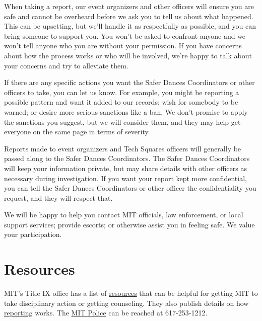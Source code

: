 \documentclass{article}
\begin{document}
When taking a report, our event organizers and other officers will ensure you are safe and cannot be overheard before we ask you to tell us about what happened. This can be upsetting, but we'll handle it as respectfully as possible, and you can bring someone to support you. You won't be asked to confront anyone and we won't tell anyone who you are without your permission. If you have concerns about how the process works or who will be involved, we're happy to talk about your concerns and try to alleviate them.

If there are any specific actions you want the Safer Dances Coordinators or other officers to take, you can let us know. For example, you might be reporting a possible pattern and want it added to our records; wish for somebody to be warned; or desire more serious sanctions like a ban. We don't promise to apply the sanctions you suggest, but we will consider them, and they may help get everyone on the same page in terms of severity.

Reports made to event organizers and Tech Squares officers will generally be passed along to the Safer Dances Coordinators. The Safer Dances Coordinators will keep your information private, but may share details with other officers as necessary during investigation. If you want your report kept more confidential, you can tell the Safer Dances Coordinators or other officer the confidentiality you request, and they will respect that.

We will be happy to help you contact MIT officials, law enforcement, or local support services; provide escorts; or otherwise assist you in feeling safe. We value your participation.

\section{Resources}
\label{sec:resources}

MIT's Title IX office has a list of \href{http://titleix.mit.edu/resources}{resources} that can be helpful for getting MIT to take disciplinary action or getting counseling. They also publish details on how \href{http://titleix.mit.edu/reporting}{reporting} works. The \href{http://police.mit.edu/report-crime-or-accident}{MIT Police} can be reached at 617-253-1212.
\end{document}

